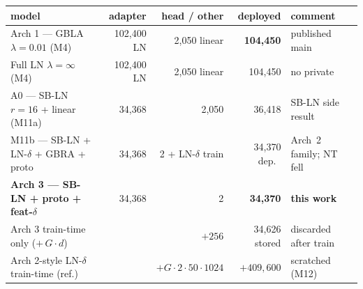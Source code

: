 \documentclass[11pt]{article}
\begin{document}
\begin{center}
\small
\renewcommand{\arraystretch}{1.2}
\begin{tabular}{L{62mm}rrrL{55mm}}
\toprule
model & adapter & head / other & \textbf{deployed} & comment \\
\midrule
Arch 1 --- GBLA \(\lambda{=}0.01\) (M4) & 102{,}400 LN & 2{,}050 linear & \textbf{104{,}450} & published main \\
Full LN \(\lambda{=}\infty\) (M4) & 102{,}400 LN & 2{,}050 linear & 104{,}450 & no private \\
A0 --- SB-LN \(r{=}16\) + linear (M11a) & 34{,}368 & 2{,}050 & 36{,}418 & SB-LN side result \\
M11b --- SB-LN + LN-\(\delta\) + GBRA + proto & 34{,}368 & 2 + LN-\(\delta\) train & 34{,}370 dep.\ & Arch~2 family; NT fell \\
\textbf{Arch 3 --- SB-LN + proto + feat-\(\delta\)} & 34{,}368 & 2 & \textbf{34{,}370} & \textbf{this work} \\
\midrule
Arch 3 train-time only (\(+\,G{\cdot}d\)) & & \(+256\) & 34{,}626 stored & discarded after train \\
Arch 2-style LN-\(\delta\) train-time (ref.) & & \(+G{\cdot}2{\cdot}50{\cdot}1024\) & \(+409{,}600\) & scratched (M12) \\
\bottomrule
\end{tabular}
\end{center}

\vspace{8mm}
\begin{center}
\end{center}
\end{document}
